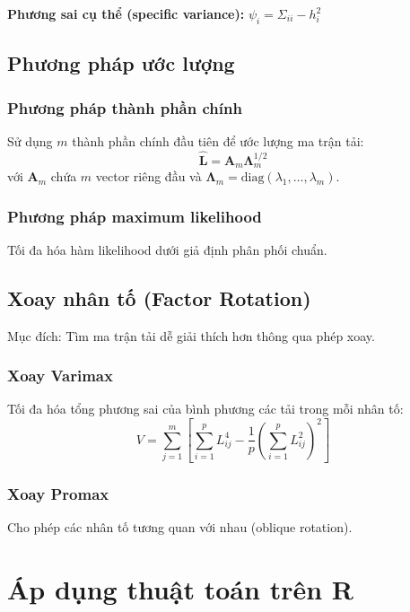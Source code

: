 \textbf{Phương sai cụ thể (specific variance):} $\psi_i = \Sigma_{ii} - h_i^2$

\subsection{Phương pháp ước lượng}
\subsubsection*{Phương pháp thành phần chính}
Sử dụng $m$ thành phần chính đầu tiên để ước lượng ma trận tải:
\[
\hat{\mathbf{L}} = \mathbf{A}_m\boldsymbol{\Lambda}_m^{1/2}
\]
với $\mathbf{A}_m$ chứa $m$ vector riêng đầu và $\boldsymbol{\Lambda}_m = \text{diag}(\lambda_1, \ldots, \lambda_m)$.

\subsubsection*{Phương pháp maximum likelihood}
Tối đa hóa hàm likelihood dưới giả định phân phối chuẩn.

\subsection{Xoay nhân tố (Factor Rotation)}
Mục đích: Tìm ma trận tải dễ giải thích hơn thông qua phép xoay.

\subsubsection*{Xoay Varimax}
Tối đa hóa tổng phương sai của bình phương các tải trong mỗi nhân tố:
\[
V = \sum_{j=1}^m \left[\sum_{i=1}^p L_{ij}^4 - \frac{1}{p}\left(\sum_{i=1}^p L_{ij}^2\right)^2\right]
\]

\subsubsection*{Xoay Promax}
Cho phép các nhân tố tương quan với nhau (oblique rotation).

\section{Áp dụng thuật toán trên R}

